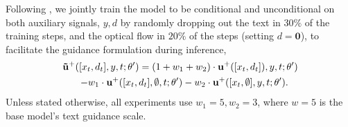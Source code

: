 Following \citet{ho2022classifier}, we jointly train the model to be conditional and unconditional on both auxiliary signals, $y, d$ by randomly dropping out the text in $30\%$ of the training steps, and the optical flow in $20\%$ of the steps (setting $d=\textbf{0}$), to facilitate the guidance formulation during inference,
\begin{align*}
    \bold{\Tilde{u}^+}([x_t, d_t], y, t; \theta') = (1+w_1+w_2)\cdot \bold{u^+}([x_t, d_t]), y, t; \theta') \\
     - w_1\cdot \bold{u^+}([x_t, d_t], \emptyset, t; \theta') -w_2 \cdot \bold{u^+}([x_t, \emptyset], y, t; \theta'). \quad
\end{align*}   
Unless stated otherwise, all experiments use $w_1=5, w_2=3$, where $w=5$ is the base model's text guidance scale.